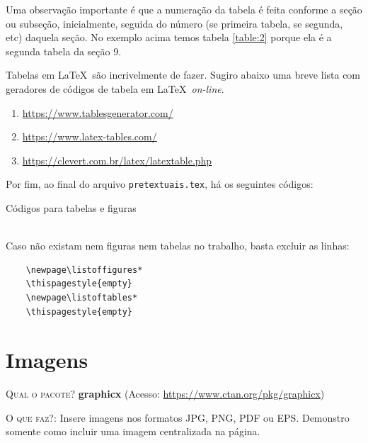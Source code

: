 \documentclass[a4paper,12pt,oneside,openright,extrafontsizes,openbib]{memoir}
\begin{document}
{Uma observação importante é que a numeração da tabela é feita conforme a seção ou subseção, inicialmente, seguida do número (se primeira tabela, se segunda, etc) daquela seção. No exemplo acima temos tabela \ref{table:2} porque ela é a segunda tabela da seção 9.

Tabelas em \LaTeX\ são incrivelmente  de fazer. Sugiro abaixo uma breve lista com geradores de códigos de tabela em \LaTeX\ \textit{on-line}.

\begin{enumerate}
	\item \url{https://www.tablesgenerator.com/}
	\item \url{https://www.latex-tables.com/}
	\item \url{https://clevert.com.br/latex/latextable.php}
\end{enumerate}

Por fim, ao final do arquivo \verb|pretextuais.tex|, há os seguintes códigos:
\ \\
\begin{codex}{Códigos para tabelas e figuras}
	\newpage\tableofcontents*
	\thispagestyle{empty}
	\newpage\listoffigures*
	\thispagestyle{empty}
	\newpage\listoftables*
	\thispagestyle{empty}
\end{codex}
\ \\
Caso não existam nem figuras nem tabelas no trabalho, basta excluir as linhas: 

\begin{verbatim} 
	\newpage\listoffigures*
	\thispagestyle{empty}
	\newpage\listoftables*
	\thispagestyle{empty} 
\end{verbatim}

\chapter{Imagens}

\textsc{Qual o pacote?} \textbf{graphicx} (Acesso: \url{https://www.ctan.org/pkg/graphicx})

\textsc{O que faz?}: Insere imagens nos formatos JPG, PNG, PDF ou EPS. Demonstro somente como incluir uma imagem centralizada na página.
\ \\

}
\end{document}
